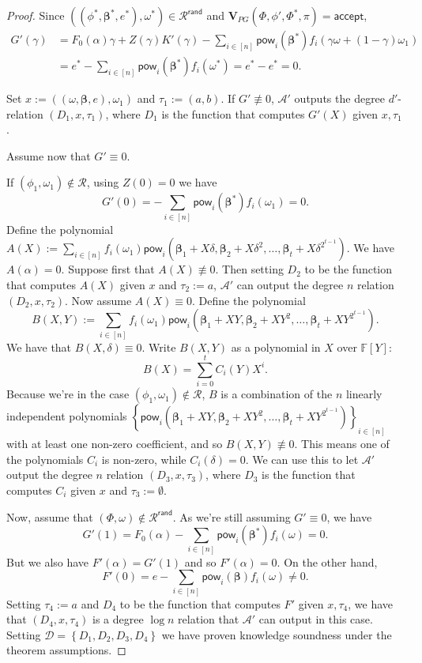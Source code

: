 \documentclass[11pt]{article} %
\newcommand{\F}{\ensuremath{\mathbb F}\xspace}
\newcommand{\advprime}{\ensuremath{{\mathcal A}'}\xspace}
\newcommand{\acc}{\ensuremath{\mathsf{accept}}\xspace}
\newcommand{\defeq}{:=}
\newcommand{\sett}[2]{\ensuremath{\set{#1}_{#2}}\xspace}
\newcommand{\prf}{\ensuremath{\mathsf{\pi}}\xspace}
\newcommand{\inst}{\ensuremath{\phi}\xspace}
\newcommand{\wit}{\ensuremath{\mathsf{\omega}}\xspace}
\newcommand{\ver}{\ensuremath{\mathsf{\mathbf{V}}}\xspace}
\newcommand{\rel}{\ensuremath{\mathcal{R}}\xspace}
\newcommand{\relrand}{\ensuremath{\mathcal{R^{\mathsf{rand}}}}\xspace}
\newcommand{\set}[1]{\ensuremath{\left\{#1\right\}}\xspace}
\newcommand{\sumi}[1]{\sum_{i\in[#1]}}
\newcommand{\betaa}{\ensuremath{\mathbf{\boldsymbol{\beta}}}\xspace}
\newcommand{\instt}{\ensuremath{\Phi^*}\xspace}
\newcommand{\insttbase}{\ensuremath{\Phi}\xspace}
\newcommand{\pow}{\ensuremath{\mathsf{pow}}\xspace}
\newcommand{\inststar}{\ensuremath{\inst^*}\xspace}
\newcommand{\witstar}{\ensuremath{\wit^*}\xspace}
\newcommand{\ztafuncs}{\ensuremath{\mathcal{D}}\xspace}
\begin{document}
\begin{proof}
Since $((\inststar,\betaa^*,e^*),\witstar)\in \relrand$ and $\ver_{PG}(\insttbase,\inst',\instt,\prf)=\acc$,
\begin{align*}
G'(\gamma) &= F_0(\alpha)\gamma + Z(\gamma)K'(\gamma)- \sum_{i\in [n]} \pow_i(\betaa^*) f_i(\gamma\wit +(1-\gamma)\wit_1) \\
           &= e^*-\sum_{i\in [n]} \pow_i(\betaa^*) f_i(\witstar) = e^*-e^* = 0.
\end{align*}

Set $x\defeq ((\wit,\betaa,e),\wit_1)$ and $\tau_1\defeq (a,b)$.
If $G'\not\equiv 0$, \advprime outputs the degree $d'$-relation $(D_1,x,\tau_1)$,
where $D_1$ is the function that computes $G'(X)$ given $x,\tau_1$.

Assume now that $G'\equiv 0$.

If $(\inst_1,\wit_1)\notin \rel$, using $Z(0)=0$ we have 
\[G'(0)= -\sum_{i\in [n]}\pow_i( \betaa^*) f_i(\wit_1)=0.\]
Define the polynomial $A(X)\defeq \sumi{n}f_i(\wit_1)\pow_i(\betaa_1+X \delta,\betaa_2 +X \delta^2,\ldots,\betaa_t+X \delta^{2^{t-1}})$.
We have $A(\alpha)=0$. Suppose first that $A(X)\not\equiv 0$. Then setting $D_2$ to be the function that computes $A(X)$ given $x$ and $\tau_2\defeq a$, \advprime can output the degree $n$ relation $(D_2,x,\tau_2)$. Now assume $A(X)\equiv 0$.
Define the polynomial 
\[B(X,Y)\defeq \sumi{n}f_i(\wit_1)\pow_i(\betaa_1+XY,\betaa_2+XY^2,\ldots,\betaa_t+X Y^{2^{t-1}}).\]
We have that $B(X,\delta)\equiv 0$.
Write $B(X,Y)$ as a polynomial in $X$ over $\F[Y]$:
\[B(X)=\sum_{i=0}^t C_i(Y)X^i.\]
Because we're in the case $(\inst_1,\wit_1)\notin \rel$, $B$ is a combination of the $n$ linearly independent polynomials $\sett{\pow_i(\betaa_1+XY,\betaa_2+XY^2,\ldots,\betaa_t+X Y^{2^{t-1}})}{i\in [n]}$ with at least one non-zero coefficient, and so $B(X,Y)\not\equiv 0$. This means one of the polynomials $C_i$ is non-zero, while $C_i(\delta)=0$.
We can use this to let \advprime output the degree $n$ relation $(D_3,x,\tau_3)$, where $D_3$ is the function that computes $C_i$ given $x$ and $\tau_3\defeq\emptyset$.

Now, assume that $(\insttbase,\wit)\notin \relrand$.
As we're still assuming $G'\equiv 0$, we have 
\[G'(1)=F_0(\alpha)-\sumi{n}\pow_i(\betaa^*) f_i(\wit)=0.\]
But we also have $F'(\alpha)=G'(1)$ and so $F'(\alpha)=0$.
On the other hand,
\[F'(0)=e-\sumi{n}\pow_i(\betaa) f_i(\wit)\neq 0.\]
Setting $\tau_4\defeq a$ and $D_4$ to be the function that computes $F'$ given $x,\tau_4$, we
have that $(D_4,x,\tau_4)$ is a degree $\log n$ relation that \advprime can output in this case.
Setting $\ztafuncs=\set{D_1,D_2,D_3,D_4}$ we have proven knowledge soundness under the theorem assumptions.
\end{proof}
\end{document}
